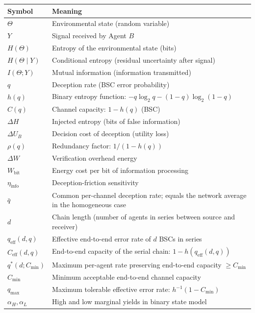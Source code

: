 \documentclass[11pt]{article}
\newcounter{none}
\begin{document}
{\def\LTcaptype{none} %
\begin{longtable}[]{@{}
  >{\raggedright\arraybackslash}p{}
  >{\raggedright\arraybackslash}p{}@{}}
\toprule\noalign{}
\begin{minipage}[b]{\linewidth}\raggedright
Symbol
\end{minipage} & \begin{minipage}[b]{\linewidth}\raggedright
Meaning
\end{minipage} \\
\midrule\noalign{}
\endhead
\bottomrule\noalign{}
\endlastfoot
\(\Theta\) & Environmental state (random variable) \\
\(Y\) & Signal received by Agent \(B\) \\
\(H(\Theta)\) & Entropy of the environmental state (bits) \\
\(H(\Theta \mid Y)\) & Conditional entropy (residual uncertainty after
signal) \\
\(I(\Theta; Y)\) & Mutual information (information transmitted) \\
\(q\) & Deception rate (BSC error probability) \\
\(h(q)\) & Binary entropy function:
\(-q \log_2 q - (1-q) \log_2(1-q)\) \\
\(C(q)\) & Channel capacity: \(1 - h(q)\) (BSC) \\
\(\Delta H\) & Injected entropy (bits of false information) \\
\(\Delta U_B\) & Decision cost of deception (utility loss) \\
\(\rho(q)\) & Redundancy factor: \(1/(1 - h(q))\) \\
\(\Delta W\) & Verification overhead energy \\
\(W_{\text{bit}}\) & Energy cost per bit of information processing \\
\(\eta_{\text{info}}\) & Deception-friction sensitivity \\
\(\bar{q}\) & Common per-channel deception rate; equals the network
average in the homogeneous case \\
\(d\) & Chain length (number of agents in series between source and
receiver) \\
\(q_{\text{eff}}(d, q)\) & Effective end-to-end error rate of \(d\) BSCs
in series \\
\(C_{\text{eff}}(d, q)\) & End-to-end capacity of the serial chain:
\(1 - h(q_{\text{eff}}(d, q))\) \\
\(q^*(d; C_{\min})\) & Maximum per-agent rate preserving end-to-end
capacity \(\geq C_{\min}\) \\
\(C_{\min}\) & Minimum acceptable end-to-end channel capacity \\
\(q_{\max}\) & Maximum tolerable effective error rate:
\(h^{-1}(1 - C_{\min})\) \\
\(\alpha_H, \alpha_L\) & High and low marginal yields in binary state
model \\
\end{longtable}
}
\end{document}
